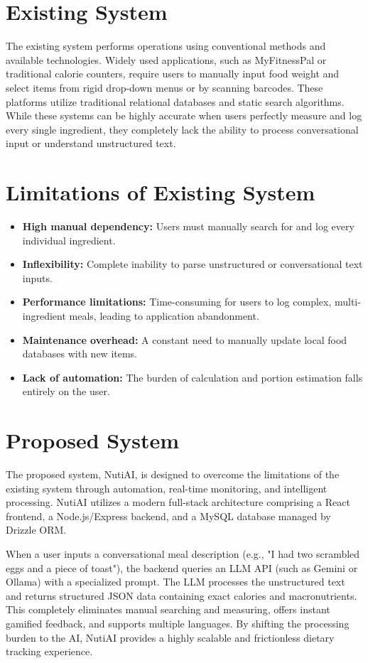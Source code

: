 \documentclass[12pt,a4paper]{report}
\begin{document}
\section{Existing System}
The existing system performs operations using conventional methods and available technologies. Widely used applications, such as MyFitnessPal or traditional calorie counters, require users to manually input food weight and select items from rigid drop-down menus or by scanning barcodes. These platforms utilize traditional relational databases and static search algorithms. While these systems can be highly accurate when users perfectly measure and log every single ingredient, they completely lack the ability to process conversational input or understand unstructured text.

\section{Limitations of Existing System}
\begin{itemize}[leftmargin=*]
    \item \textbf{High manual dependency:} Users must manually search for and log every individual ingredient.
    \item \textbf{Inflexibility:} Complete inability to parse unstructured or conversational text inputs.
    \item \textbf{Performance limitations:} Time-consuming for users to log complex, multi-ingredient meals, leading to application abandonment.
    \item \textbf{Maintenance overhead:} A constant need to manually update local food databases with new items.
    \item \textbf{Lack of automation:} The burden of calculation and portion estimation falls entirely on the user.
\end{itemize}

\section{Proposed System}
The proposed system, NutiAI, is designed to overcome the limitations of the existing system through automation, real-time monitoring, and intelligent processing. NutiAI utilizes a modern full-stack architecture comprising a React frontend, a Node.js/Express backend, and a MySQL database managed by Drizzle ORM. 

When a user inputs a conversational meal description (e.g., "I had two scrambled eggs and a piece of toast"), the backend queries an LLM API (such as Gemini or Ollama) with a specialized prompt. The LLM processes the unstructured text and returns structured JSON data containing exact calories and macronutrients. This completely eliminates manual searching and measuring, offers instant gamified feedback, and supports multiple languages. By shifting the processing burden to the AI, NutiAI provides a highly scalable and frictionless dietary tracking experience.
\end{document}
